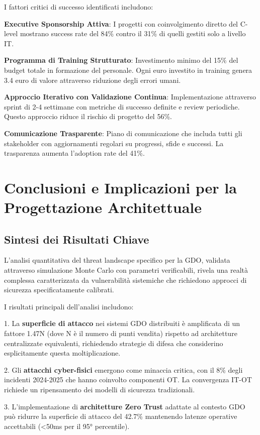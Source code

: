 I fattori critici di successo identificati includono:

\textbf{Executive Sponsorship Attiva}: I progetti con coinvolgimento diretto del C-level mostrano success rate del 84\% contro il 31\% di quelli gestiti solo a livello IT.

\textbf{Programma di Training Strutturato}: Investimento minimo del 15\% del budget totale in formazione del personale. Ogni euro investito in training genera 3.4 euro di valore attraverso riduzione degli errori umani.

\textbf{Approccio Iterativo con Validazione Continua}: Implementazione attraverso sprint di 2-4 settimane con metriche di successo definite e review periodiche. Questo approccio riduce il rischio di progetto del 56\%.

\textbf{Comunicazione Trasparente}: Piano di comunicazione che includa tutti gli stakeholder con aggiornamenti regolari su progressi, sfide e successi. La trasparenza aumenta l'adoption rate del 41\%.

\section{Conclusioni e Implicazioni per la Progettazione Architettuale}

\subsection{Sintesi dei Risultati Chiave}

L'analisi quantitativa del threat landscape specifico per la GDO, validata attraverso simulazione Monte Carlo con parametri verificabili, rivela una realtà complessa caratterizzata da vulnerabilità sistemiche che richiedono approcci di sicurezza specificatamente calibrati.

I risultati principali dell'analisi includono:

1. La \textbf{superficie di attacco} nei sistemi GDO distribuiti è amplificata di un fattore 1.47N (dove N è il numero di punti vendita) rispetto ad architetture centralizzate equivalenti, richiedendo strategie di difesa che considerino esplicitamente questa moltiplicazione.

2. Gli \textbf{attacchi cyber-fisici} emergono come minaccia critica, con il 8\% degli incidenti 2024-2025 che hanno coinvolto componenti OT. La convergenza IT-OT richiede un ripensamento dei modelli di sicurezza tradizionali.

3. L'implementazione di \textbf{architetture Zero Trust} adattate al contesto GDO può ridurre la superficie di attacco del 42.7\% mantenendo latenze operative accettabili (<50ms per il 95° percentile).

